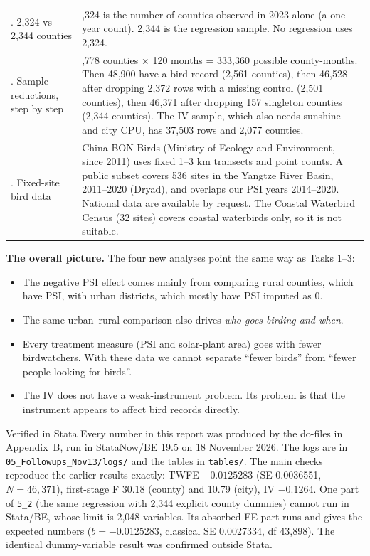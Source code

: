 \documentclass[11pt]{article}
\begin{document}
\begin{center}
\begin{tabularx}{\linewidth}{>{\raggedright\arraybackslash}p{3.6cm} >{\raggedright\arraybackslash}X}
\addlinespace
5. 2,324 vs 2,344 counties &
2,324 is the number of counties observed in 2023 alone (a one-year count). 2,344 is the regression sample. No regression uses 2,324. \\
\addlinespace
6. Sample reductions, step by step &
2,778 counties $\times$ 120 months = 333,360 possible county-months. Then 48,900 have a bird record (2,561 counties), then 46,528 after dropping 2,372 rows with a missing control (2,501 counties), then 46,371 after dropping 157 singleton counties (2,344 counties). The IV sample, which also needs sunshine and city CPU, has 37,503 rows and 2,077 counties. \\
\addlinespace
7. Fixed-site bird data &
China BON-Birds (Ministry of Ecology and Environment, since 2011) uses fixed 1--3 km transects and point counts. A public subset covers 536 sites in the Yangtze River Basin, 2011--2020 (Dryad), and overlaps our PSI years 2014--2020. National data are available by request. The Coastal Waterbird Census (32 sites) covers coastal waterbirds only, so it is not suitable. \\
\bottomrule
\end{tabularx}
\end{center}

\begin{answerbox}
\textbf{The overall picture.} The four new analyses point the same way as Tasks 1--3:
\begin{itemize}[leftmargin=14pt,itemsep=1pt,topsep=2pt]
\item The negative PSI effect comes mainly from comparing rural counties, which have PSI, with urban districts, which mostly have PSI imputed as 0.
\item The same urban--rural comparison also drives \emph{who goes birding and when}.
\item Every treatment measure (PSI and solar-plant area) goes with fewer birdwatchers. With these data we cannot separate ``fewer birds'' from ``fewer people looking for birds''.
\item The IV does not have a weak-instrument problem. Its problem is that the instrument appears to affect bird records directly.
\end{itemize}
\end{answerbox}

\begin{keybox}{Verified in Stata}
Every number in this report was produced by the do-files in Appendix~B, run in StataNow/BE 19.5 on 18 November 2026. The logs are in \texttt{05\_Followups\_Nov13/logs/} and the tables in \texttt{tables/}. The main checks reproduce the earlier results exactly: TWFE $-0.0125283$ (SE 0.0036551, $N=46{,}371$), first-stage F 30.18 (county) and 10.79 (city), IV $-0.1264$. One part of \texttt{5\_2} (the same regression with 2,344 explicit county dummies) cannot run in Stata/BE, whose limit is 2,048 variables. Its absorbed-FE part runs and gives the expected numbers ($b=-0.0125283$, classical SE 0.0027334, df 43,898). The identical dummy-variable result was confirmed outside Stata.
\end{keybox}
\end{document}
